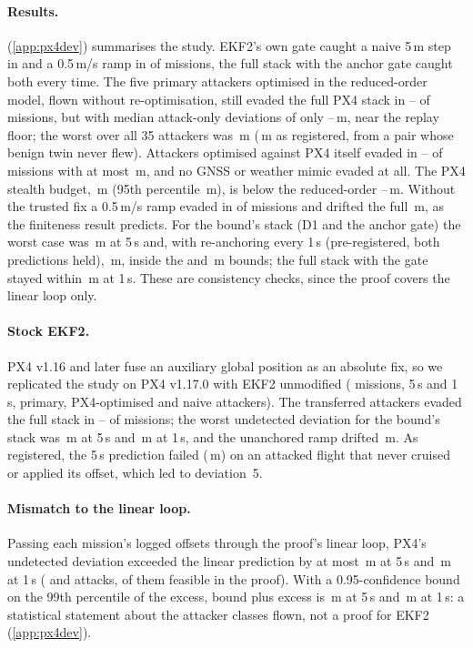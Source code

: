 \paragraph{Results.}
 (\cref{app:px4dev}) summarises the study. EKF2's own gate caught
a naive 5\,m step in \nPxEOneStepDTwo{} and a 0.5\,m/s ramp in \nPxEOneRampDTwo{}
of missions, the full stack with the anchor gate caught both every time. The
five primary attackers optimised in the reduced-order model, flown without
re-optimisation, still evaded the full PX4 stack in \nPxEvMin--\nPxEvMax{} of
missions, but with median attack-only deviations of only \nPxQfMin--\nPxQfMax\,m,
near the replay floor; the worst over all 35 attackers was \nPxWorstAllGate\,m
(\nPxWorstAllGateReg\,m as registered, from a pair whose benign twin never flew).
Attackers optimised against PX4 itself evaded in \nPxCemEvMin--\nPxCemEvMax{} of
missions with at most \nPxCemDevMax\,m, and no GNSS or weather mimic evaded at
all. The PX4 stealth budget, \nPxDadv\,m (95th percentile \nPxDadvQnf\,m), is below
the reduced-order \nPxDadvRoPilot--\nPxDadvRoPooled\,m. Without the trusted fix a
0.5\,m/s ramp evaded in \nPxNoAnchorEv{} of missions and drifted the full
\nPxNoAnchorDev\,m, as the finiteness result predicts. For the bound's stack (D1
and the anchor gate) the worst case was \nPxWorstDOneGate\,m at 5\,s and, with
re-anchoring every 1\,s (pre-registered, both predictions held),
\nPxTaWorstDOneGate\,m, inside the \nBoundTaFive{} and \nBoundTaOne\,m bounds; the
full stack with the gate stayed within \nPxTaWorstAllGate\,m at 1\,s. These are
consistency checks, since the proof covers the linear loop only.

\paragraph{Stock EKF2.}
PX4 v1.16 and later fuse an auxiliary global position as an absolute fix, so we
replicated the study on PX4 v1.17.0 with EKF2 unmodified (\nStMissions{} missions,
5\,s and 1\,s, primary, PX4-optimised and naive attackers). The transferred
attackers evaded the full stack in \nStEvMin--\nStEvMax{} of missions; the worst
undetected deviation for the bound's stack was \nStDOneGateFive\,m at 5\,s and
\nStDOneGateOne\,m at 1\,s, and the unanchored ramp drifted \nStNoAnchorDev\,m.
As registered, the 5\,s prediction failed (\nStRegDOneGateFive\,m) on an attacked
flight that never cruised or applied its offset, which led to deviation~5.

\paragraph{Mismatch to the linear loop.}
Passing each mission's logged offsets through the proof's linear loop, PX4's
undetected deviation exceeded the linear prediction by at most \nMmFivePlusMax\,m
at 5\,s and \nMmOnePlusMax\,m at 1\,s (\nMmFiveN{} and \nMmOneN{} attacks,
\nMmFiveFeas{} of them feasible in the proof). With a 0.95-confidence bound on the
99th percentile of the excess, bound plus excess is \nMmFivePlusStat\,m at 5\,s and
\nMmOnePlusStat\,m at 1\,s: a statistical statement about the attacker classes
flown, not a proof for EKF2 (\cref{app:px4dev}).

